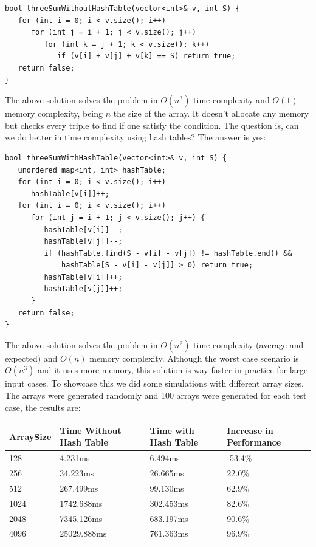 \begin{lstlisting}
bool threeSumWithoutHashTable(vector<int>& v, int S) {
   for (int i = 0; i < v.size(); i++)
      for (int j = i + 1; j < v.size(); j++)
         for (int k = j + 1; k < v.size(); k++)
            if (v[i] + v[j] + v[k] == S) return true;
   return false;
}
\end{lstlisting}

The above solution solves the problem in \( O(n^3) \) time complexity and \( O(1) \) memory complexity, being \( n \) the size of the array. It doesn't allocate any memory but checks every triple to find if one satisfy the condition. The question is, can we do better in time complexity using hash tables? The answer is yes:

\begin{lstlisting}
bool threeSumWithHashTable(vector<int>& v, int S) {
   unordered_map<int, int> hashTable; 
   for (int i = 0; i < v.size(); i++)
      hashTable[v[i]]++;
   for (int i = 0; i < v.size(); i++)
      for (int j = i + 1; j < v.size(); j++) {
         hashTable[v[i]]--;
         hashTable[v[j]]--;         
         if (hashTable.find(S - v[i] - v[j]) != hashTable.end() &&
             hashTable[S - v[i] - v[j]] > 0) return true;
         hashTable[v[i]]++;
         hashTable[v[j]]++;
      }
   return false;
}
\end{lstlisting}

The above solution solves the problem in \( O(n^2) \) time complexity (average and expected) and \( O(n) \) memory complexity. Although the worst case scenario is \( O(n^3) \) and it uses more memory, this solution is way faster in practice for large input cases. To showcase this we did some simulations with different array sizes. The arrays were generated randomly and 100 arrays were generated for each test case, the results are: \\

\bigskip

\begin{tabular}{|l|l|l|l|}
  \hline
  ArraySize & Time Without Hash Table & Time with Hash Table & Increase in Performance \\
  \hline
  128       & 4.231ms                 & 6.494ms              & -53.4\%                  \\
  \hline
  256       & 34.223ms                & 26.665ms             & 22.0\%                   \\
  \hline
  512       & 267.499ms               & 99.130ms             & 62.9\%                   \\
  \hline
  1024      & 1742.688ms              & 302.453ms            & 82.6\%                   \\
  \hline
  2048      & 7345.126ms              & 683.197ms            & 90.6\%                   \\
  \hline
  4096      & 25029.888ms             & 761.363ms            & 96.9\%                   \\
  \hline
\end{tabular}

